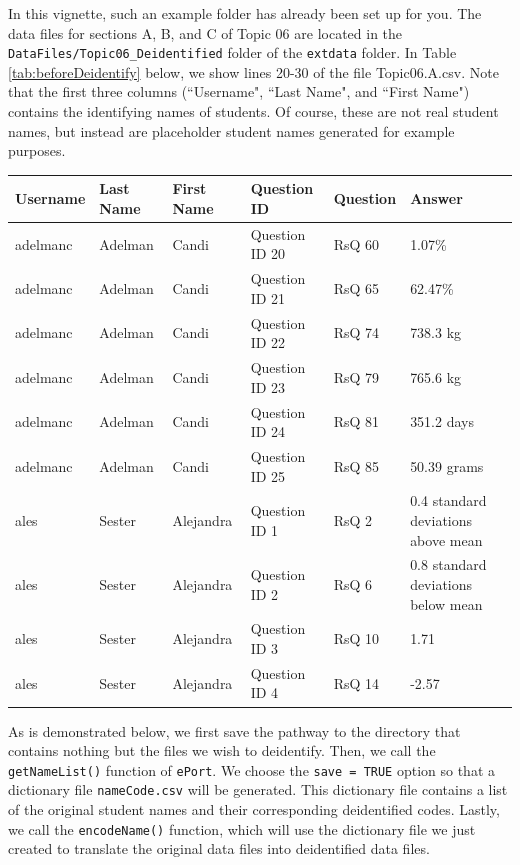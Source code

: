 \documentclass{article}\usepackage[]{graphicx}\usepackage[]{color}
\numberwithin{equation}{section} %
\begin{document}
In this vignette, such an example folder has already been set up for you. The data files for sections A, B, and C of Topic 06 are located in the \texttt{DataFiles/Topic06\_Deidentified} folder of the \texttt{extdata} folder. In Table \ref{tab:beforeDeidentify} below, we show lines 20-30 of the file Topic06.A.csv. Note that the first three columns (``Username", ``Last Name", and ``First Name") contains the identifying names of students. Of course, these are not real student names, but instead are placeholder student names generated for example purposes. \\

\begin{center}
\label{tab:beforeDeidentify}
\begin{tabular} { | l | l | l | l | l | l |}
\hline \textbf{Username} & \textbf{Last Name} & \textbf{First Name} & \textbf{Question ID} & \textbf{Question} & \textbf{Answer} \\
\hline
adelmanc & Adelman & Candi & Question ID 20 & RsQ 60 & 1.07\% \\
\hline
adelmanc & Adelman & Candi & Question ID 21 & RsQ 65 & 62.47\% \\
\hline
adelmanc & Adelman & Candi & Question ID 22 & RsQ 74 & 738.3 kg \\
\hline
adelmanc & Adelman & Candi & Question ID 23 & RsQ 79 & 765.6 kg\\
\hline
adelmanc & Adelman & Candi & Question ID 24 & RsQ 81 & 351.2 days \\
\hline
adelmanc & Adelman & Candi & Question ID 25 & RsQ 85 & 50.39 grams \\
\hline
ales & Sester & Alejandra & Question ID 1 & RsQ 2 & 0.4 standard deviations above mean \\
\hline
ales & Sester & Alejandra & Question ID 2 & RsQ 6 & 0.8 standard deviations below mean \\
\hline
ales & Sester & Alejandra & Question ID 3 & RsQ 10 & 1.71 \\
\hline
ales & Sester & Alejandra & Question ID 4 & RsQ 14 & -2.57 \\
\hline
\end{tabular}
\end{center}

As is demonstrated below, we first save the pathway to the directory that contains nothing but the files we wish to deidentify. Then, we call the \texttt{getNameList()} function of \texttt{ePort}. We choose the \texttt{save = TRUE} option so that a dictionary file \texttt{nameCode.csv} will be generated. This dictionary file contains a list of the original student names and their corresponding deidentified codes. Lastly, we call the \texttt{encodeName()} function, which will use the dictionary file we just created to translate the original data files into deidentified data files.
\end{document}
